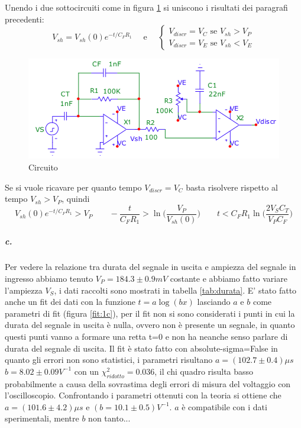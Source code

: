 \documentclass{article}
\newcommand{\vz}{V_{sh}(0)}
\begin{document}
		Unendo i due sottocircuiti come in figura \ref{fig:circ} si uniscono i risultati dei paragrafi precedenti:
		\begin{equation}
			V_{sh}=\vz e^{-t/C_FR_1}\quad \textrm{ e }\quad 
			\begin{cases}
				V_{discr}=V_C \textrm{ se } V_{sh}>V_P\\
				V_{discr}=V_E \textrm{ se } V_{sh}<V_E
			\end{cases}
		\end{equation}
		\begin{figure}
			\centering
			\includegraphics[width=120mm]{immagini/circa.png}
			\caption{Circuito}
			\label{fig:circ}
		\end{figure}
		Se si vuole ricavare per quanto tempo $V_{discr}=V_C$ basta risolvere rispetto al tempo $V_{sh}>V_P$, quindi
		\begin{equation}
			\vz e^{-t/C_FR_1}>V_P\qquad-\frac{t}{C_FR_1}>\ln \bigg(\frac{V_P}{\vz }\bigg)\qquad t<C_FR_1\ln \bigg(\frac{2V_SC_T}{V_PC_F}\bigg)
		\end{equation}

	
	\subparagraph{c.}
		Per vedere la relazione tra durata del segnale in uscita e ampiezza del segnale in ingresso abbiamo tenuto $V_P=184.3\pm0.9 mV$ costante e abbiamo fatto variare l'ampiezza $V_S$, i dati raccolti sono mostrati in tabella \ref{tab:durata}. E' stato fatto anche un fit dei dati con la funzione $t=a \log(bx)$ lasciando $a$ e $b$ come parametri di fit (figura \ref{fit:1c}), per il fit non si sono considerati i punti in cui la durata del segnale in uscita è nulla, ovvero non è presente un segnale, in quanto questi punti vanno a formare una retta t=0 e non ha neanche senso parlare di durata del segnale di uscita.\newline
		Il fit  è stato fatto con absolute-sigma=False in quanto gli errori non sono statistici, i parametri risultano $a=(102.7\pm0.4)\mu s$ $b=8.02\pm0.09 V^{-1}$ con un $\chi^2_{ridotto}=0.036$, il chi quadro risulta basso probabilmente a causa della sovrastima degli errori di misura del voltaggio con l'oscilloscopio. Confrontando i parametri ottenuti con la teoria si ottiene che $a=(101.6\pm4.2)\mu s$ e $(b=10.1\pm0.5)V^{-1}$. $a$ è compatibile con i dati sperimentali, mentre $b$ non tanto...
	
\end{document}
